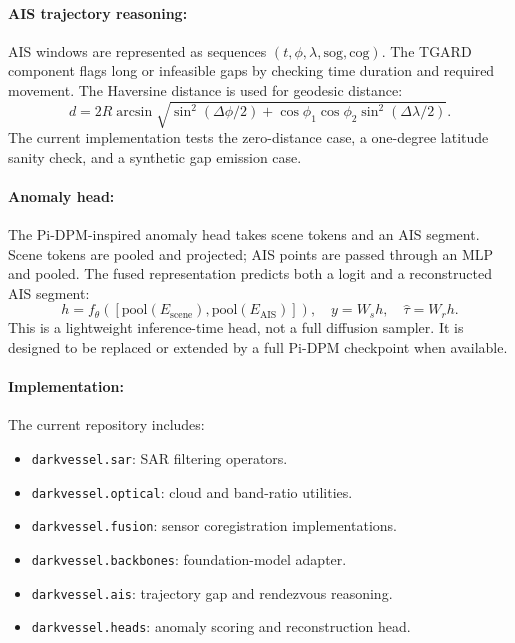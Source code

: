 \documentclass{article}
\begin{document}
\paragraph{AIS trajectory reasoning:}

AIS windows are represented as sequences $(t,\phi,\lambda,\text{sog},\text{cog})$. The TGARD component flags long or infeasible gaps by checking time duration and required movement. The Haversine distance is used for geodesic distance:
\begin{equation}
  d = 2R\arcsin\sqrt{\sin^2(\Delta\phi/2)+\cos\phi_1\cos\phi_2\sin^2(\Delta\lambda/2)}.
\end{equation}
The current implementation tests the zero-distance case, a one-degree latitude sanity check, and a synthetic gap emission case.

\paragraph{Anomaly head:}

The Pi-DPM-inspired anomaly head takes scene tokens and an AIS segment. Scene tokens are pooled and projected; AIS points are passed through an MLP and pooled. The fused representation predicts both a logit and a reconstructed AIS segment:
\begin{equation}
  h = f_{\theta}\left([\text{pool}(E_{\text{scene}}), \text{pool}(E_{\text{AIS}})]\right),
  \quad
  y = W_s h,\quad
  \hat{\tau}=W_r h.
\end{equation}
This is a lightweight inference-time head, not a full diffusion sampler. It is designed to be replaced or extended by a full Pi-DPM checkpoint when available.

\paragraph{Implementation:}

The current repository includes:
\begin{itemize}
  \item \texttt{darkvessel.sar}: SAR filtering operators.
  \item \texttt{darkvessel.optical}: cloud and band-ratio utilities.
  \item \texttt{darkvessel.fusion}: sensor coregistration implementations.
  \item \texttt{darkvessel.backbones}: foundation-model adapter.
  \item \texttt{darkvessel.ais}: trajectory gap and rendezvous reasoning.
  \item \texttt{darkvessel.heads}: anomaly scoring and reconstruction head.
\end{itemize}
\end{document}
